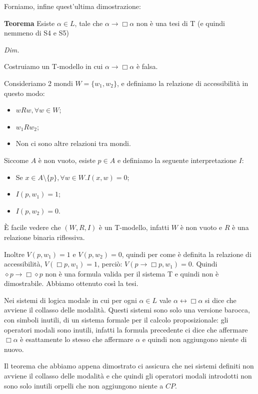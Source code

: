 \documentclass[a4paper, 12pt]{article}
\begin{document}
Forniamo, infine quest'ultima dimostrazione:

\begin{flushleft}
\textbf{Teorema}
Esiste $\alpha \in L$, tale che $\alpha \rightarrow \Box \alpha$ non è una tesi di T (e quindi nemmeno di S4 e S5)

\textit{Dim.}

Costruiamo un T-modello in cui $\alpha \rightarrow \Box \alpha$ è falsa.

Consideriamo 2 mondi $W = \{w_1, w_2\}$, e definiamo la relazione di accessibilità
in questo modo:
\begin{itemize}
    \item $wRw, \forall w \in W$;
    \item $w_1Rw_2$;
    \item Non ci sono altre relazioni tra mondi.
\end{itemize}

Siccome $A$ è non vuoto, esiste $p \in A$ e definiamo la seguente interpretazione $I:$
\begin{itemize}
    \item Se $x \in A \setminus \{p\}, \forall w \in W. I(x, w) = 0$;
    \item $I(p, w_1) = 1$;
    \item $I(p, w_2) = 0$.
\end{itemize}


È facile vedere che $(W, R, I)$ è un T-modello, infatti $W$ è non vuoto e
$R$ è una relazione binaria riflessiva.

Inoltre $V(p, w_1) = 1$ e $V(p, w_2) = 0$, quindi per come è definita
la relazione di accessibilità, $V(\Box p, w_1) = 1$, perciò: $V(p \rightarrow \Box p, w_1) = 0$.
Quindi $\diamond p \rightarrow \Box\diamond p$ non è una formula valida per il sistema T e quindi
non è dimostrabile.
Abbiamo ottenuto così la tesi.

\end{flushleft}

Nei sistemi di logica modale in cui per ogni
$\alpha \in L$ vale $\alpha \leftrightarrow \Box \alpha$ si dice che avviene il collasso
delle modalità. Questi sistemi sono solo una versione barocca, con simboli inutili,
di un sistema formale per il calcolo proposizionale:
gli operatori modali sono inutili, infatti la formula
precedente ci dice che affermare $\Box \alpha$ è esattamente lo stesso che affermare $\alpha$
e quindi non aggiungono niente di nuovo.

Il teorema che abbiamo appena dimostrato ci assicura che nei sistemi definiti non avviene
il collasso delle modalità e che quindi gli operatori modali introdotti non sono solo inutili
orpelli che non aggiungono niente a $CP$.
\end{document}
